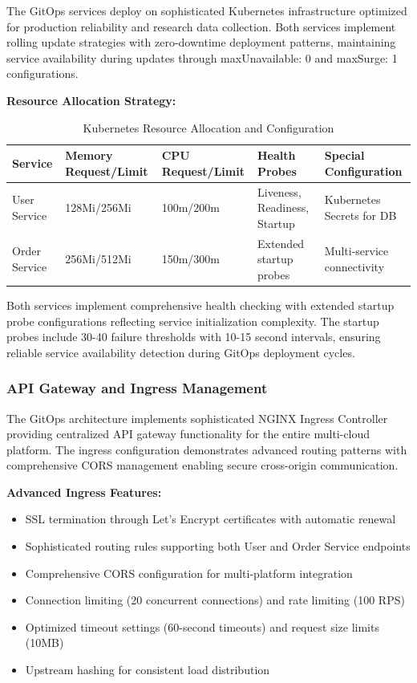 The GitOps services deploy on sophisticated Kubernetes infrastructure optimized for production reliability and research data collection. Both services implement rolling update strategies with zero-downtime deployment patterns, maintaining service availability during updates through maxUnavailable: 0 and maxSurge: 1 configurations.

\textbf{Resource Allocation Strategy:}

\begin{table}[H]
\centering
\caption{Kubernetes Resource Allocation and Configuration}
\label{tab:kubernetes-resource-allocation}
\begin{tabular}{|p{3cm}|p{2.5cm}|p{2.5cm}|p{3cm}|p{3cm}|}
\hline
\textbf{Service} & \textbf{Memory Request/Limit} & \textbf{CPU Request/Limit} & \textbf{Health Probes} & \textbf{Special Configuration} \\
\hline
User Service & 128Mi/256Mi & 100m/200m & Liveness, Readiness, Startup & Kubernetes Secrets for DB \\
\hline
Order Service & 256Mi/512Mi & 150m/300m & Extended startup probes & Multi-service connectivity \\
\hline
\end{tabular}
\end{table}

Both services implement comprehensive health checking with extended startup probe configurations reflecting service initialization complexity. The startup probes include 30-40 failure thresholds with 10-15 second intervals, ensuring reliable service availability detection during GitOps deployment cycles.

\subsubsection{API Gateway and Ingress Management}

The GitOps architecture implements sophisticated NGINX Ingress Controller providing centralized API gateway functionality for the entire multi-cloud platform. The ingress configuration demonstrates advanced routing patterns with comprehensive CORS management enabling secure cross-origin communication.

\textbf{Advanced Ingress Features:}
\begin{itemize}
\item SSL termination through Let's Encrypt certificates with automatic renewal
\item Sophisticated routing rules supporting both User and Order Service endpoints
\item Comprehensive CORS configuration for multi-platform integration
\item Connection limiting (20 concurrent connections) and rate limiting (100 RPS)
\item Optimized timeout settings (60-second timeouts) and request size limits (10MB)
\item Upstream hashing for consistent load distribution
\end{itemize}

